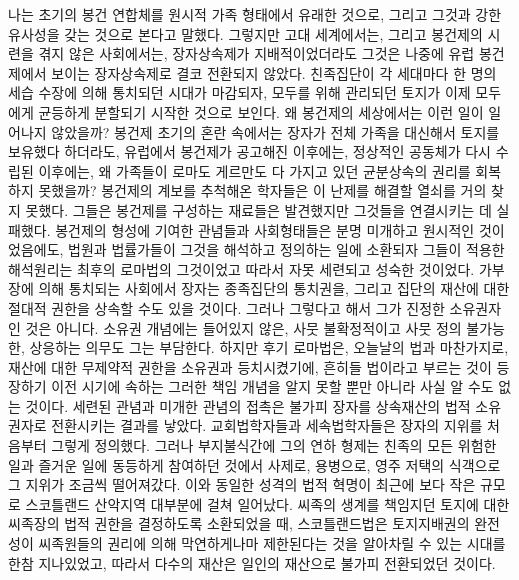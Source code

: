 나는 초기의 봉건 연합체를 원시적 가족 형태에서 유래한 것으로,
그리고
그것과 강한 유사성을 갖는 것으로 본다고 말했다.
그렇지만 고대 세계에서는,
그리고 봉건제의 시련을 겪지 않은 사회에서는,
장자상속제가 지배적이었더라도 그것은 나중에 유럽 봉건제에서 보이는
장자상속제로 결코 전환되지 않았다.
친족집단이 각 세대마다 한 명의 세습 수장에 의해 통치되던 시대가 마감되자,
모두를 위해 관리되던 토지가 이제 모두에게 균등하게 분할되기
시작한 것으로 보인다.
왜 봉건제의 세상에서는 이런 일이 일어나지 않았을까?
봉건제 초기의 혼란 속에서는 장자가
전체 가족을 대신해서 토지를 보유했다 하더라도,
유럽에서 봉건제가 공고해진 이후에는,
정상적인 공동체가 다시 수립된 이후에는,
왜 가족들이
로마도 게르만도 다 가지고 있던 균분상속의 권리를
회복하지 못했을까?
봉건제의 계보를 추척해온 학자들은
이 난제를 해결할 열쇠를 거의 찾지 못했다.
그들은 봉건제를 구성하는 재료들은 발견했지만
그것들을 연결시키는 데 실패했다.
봉건제의 형성에 기여한 관념들과 사회형태들은
분명 미개하고 원시적인 것이었음에도,
법원과 법률가들이 그것을 해석하고 정의하는 일에 소환되자
그들이 적용한 해석원리는 최후의 로마법의 그것이었고
따라서 자못 세련되고 성숙한 것이었다.
가부장에 의해 통치되는 사회에서
장자는 종족집단의 통치권을,
그리고 집단의 재산에 대한 절대적 권한을 상속할 수도 있을 것이다.
그러나 그렇다고 해서 그가 진정한 소유권자인 것은 아니다.
소유권 개념에는 들어있지 않은,
사뭇 불확정적이고 사뭇 정의 불가능한,
상응하는 의무도 그는 부담한다.
하지만 후기 로마법은, 오늘날의 법과 마찬가지로,
재산에 대한 무제약적 권한을 소유권과 등치시켰기에,
흔히들 법이라고 부르는 것이 등장하기 이전 시기에 속하는
그러한 책임 개념을 알지 못할 뿐만 아니라 사실 알 수도 없는 것이다.
세련된 관념과 미개한 관념의 접촉은 불가피
장자를 상속재산의 법적 소유권자로 전환시키는 결과를 낳았다.
교회법학자들과 세속법학자들은 장자의 지위를 처음부터 그렇게 정의했다.
그러나 부지불식간에 그의 연하 형제는
친족의 모든 위험한 일과 즐거운 일에 동등하게 참여하던 것에서
사제로, 용병으로, 영주 저택의 식객으로 그 지위가 조금씩 떨어져갔다.
이와 동일한 성격의 법적 혁명이
최근에
보다 작은 규모로
스코틀랜드 산악지역 대부분에 걸쳐 일어났다.
씨족의 생계를 책임지던 토지에 대한 씨족장의 법적 권한을
결정하도록 소환되었을 때, 스코틀랜드법은
토지지배권의 완전성이
씨족원들의 권리에 의해 막연하게나마 제한된다는 것을
알아차릴 수 있는 시대를 한참 지나있었고,
따라서 다수의 재산은 일인의 재산으로 불가피 전환되었던 것이다.

